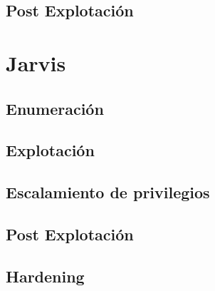 \documentclass{article}
\begin{document}
\subsection{Post Explotación}

\section{Jarvis}
\subsection{Enumeración}

\subsection{Explotación}

\subsection{Escalamiento de privilegios}


\subsection{Post Explotación}

\subsection{Hardening}
\end{document}
